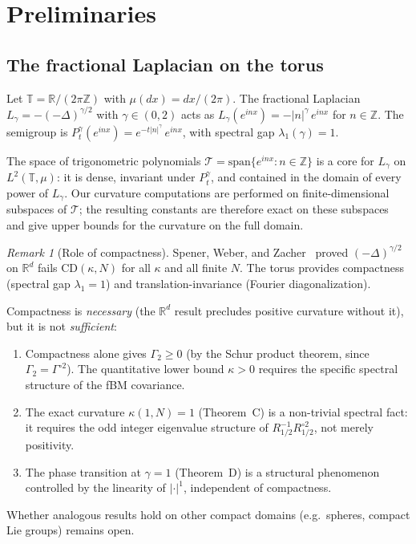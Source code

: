 \documentclass[11pt,a4paper]{article}
\theoremstyle{plain}
\theoremstyle{definition}
\theoremstyle{remark}
\newtheorem{remark}[theorem]{Remark}
\newcommand{\R}{\mathbb{R}}
\newcommand{\Z}{\mathbb{Z}}
\newcommand{\T}{\mathbb{T}}
\begin{document}
\section{Preliminaries}\label{sec:prelim}

\subsection{The fractional Laplacian on the torus}

Let $\T = \R/(2\pi\Z)$ with $\mu(dx) = dx/(2\pi)$. The fractional
Laplacian $L_\gamma = -(-\Delta)^{\gamma/2}$ with $\gamma \in (0,2)$
acts as $L_\gamma(e^{inx}) = -|n|^\gamma\,e^{inx}$ for $n \in \Z$.
The semigroup is $P_t^\gamma(e^{inx}) = e^{-t|n|^\gamma}\,e^{inx}$,
with spectral gap $\lambda_1(\gamma) = 1$.

The space of trigonometric polynomials
$\mathcal{T} = \mathrm{span}\{e^{inx} : n \in \Z\}$ is a core
for $L_\gamma$ on $L^2(\T,\mu)$: it is dense, invariant under $P_t^\gamma$,
and contained in the domain of every power of $L_\gamma$.
Our curvature computations are performed on finite-dimensional
subspaces of $\mathcal{T}$; the resulting constants are therefore
exact on these subspaces and give upper bounds for the curvature
on the full domain.

\begin{remark}[Role of compactness]\label{rem:compact}
Spener, Weber, and Zacher~\cite{SpenerWeberZacher2020} proved
$(-\Delta)^{\gamma/2}$ on $\R^d$ fails $\mathrm{CD}(\kappa,N)$
for all $\kappa$ and all finite $N$. The torus provides
compactness (spectral gap $\lambda_1 = 1$) and
translation-invariance (Fourier diagonalization).

Compactness is \emph{necessary} (the $\R^d$ result precludes
positive curvature without it), but it is not \emph{sufficient}:
\begin{enumerate}[label=(\roman*)]
\item Compactness alone gives $\Gamma_2 \geq 0$ (by the
  Schur product theorem, since $\Gamma_2 = \Gamma^{\circ 2}$).
  The quantitative lower bound $\kappa > 0$ requires the
  specific spectral structure of the fBM covariance.
\item The exact curvature $\kappa(1,N) = 1$ (Theorem~C) is
  a non-trivial spectral fact: it requires the odd integer
  eigenvalue structure of $R_{1/2}^{-1}R_{1/2}^{\circ 2}$,
  not merely positivity.
\item The phase transition at $\gamma = 1$ (Theorem~D) is a
  structural phenomenon controlled by the linearity of
  $|\cdot|^1$, independent of compactness.
\end{enumerate}
Whether analogous results hold on other compact domains
(e.g.\ spheres, compact Lie groups) remains open.
\end{remark}
\end{document}
